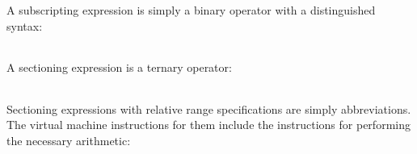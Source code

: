 A subscripting expression is simply a binary operator with a
distinguished syntax:

\begin{center}
\tablelasttail{\hline}
\begin{supertabular}{|m{1.9073598in}|m{2.75596in}|}

\end{supertabular}
\end{center}

A sectioning expression is a ternary operator:

\begin{center}
\tablelasttail{\hline}
\begin{supertabular}{|m{1.9073598in}|m{2.75596in}|}

\end{supertabular}
\end{center}

Sectioning expressions with relative range specifications are simply
abbreviations. The virtual machine instructions for them include the
instructions for performing the necessary arithmetic:

\begin{center}
\tablelasttail{\hline}
\begin{supertabular}{|m{1.9073598in}|m{2.75596in}|}

\end{supertabular}
\end{center}


